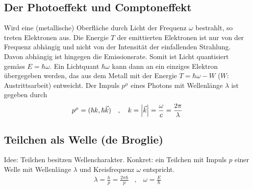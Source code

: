 \subsection{Der Photoeffekt und Comptoneffekt}
Wird eine (metallische) Oberfläche durch Licht der Frequenz $\omega$
bestrahlt, so treten Elektronen aus. Die Energie $T$ der emittierten
Elektronen ist nur von der Frequenz abhängig und nicht von der Intensität
der einfallenden Strahlung. Davon abhängig ist hingegen die Emissionsrate.
Somit ist Licht quantisiert gemäss $E = \hbar \omega$. Ein Lichtquant $\hbar
\omega$ kann dann an ein einziges Elektron übergegeben werden, das aus dem
Metall mit der Energie $T = \hbar \omega - W$ ($W$: Austrittsarbeit) entweicht.
Der Impuls $p^\mu$ eines Photons mit Wellenlänge $\lambda$ ist gegeben durch
\begin{align*}
    p^\mu = (\hbar k , \hbar \vec{k})
    \hspace{10pt} , \hspace{10pt}
    k = \left\vert \vec{k} \right\vert = \frac{\omega}{c} = \frac{2 \pi}{\lambda}
\end{align*}

\subsection{Teilchen als Welle (de Broglie)}
Idee: Teilchen besitzen Wellencharakter. Konkret: ein Teilchen mit Impuls $p$
einer Welle mit Wellenlänge $\lambda$ und Kreisfrequenz $\omega$ entspricht.
\begin{align}\label{deBroglie}
    \lambda = \frac{h}{p} = \frac{2 \pi \hbar}{p}
    \hspace{10pt} , \hspace{10pt}
    \omega = \frac{E}{\hbar}
\end{align}
